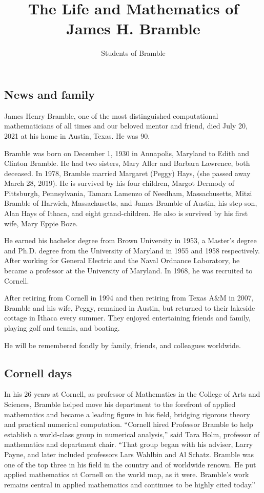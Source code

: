 \documentclass[CJK,11pt]{amsart}
\theoremstyle{definition}
\begin{document}
\begin{CJK*}{UTF8}{gbsn}
\title{
The Life and Mathematics of James H. Bramble
}
\author{Students of Bramble}
\maketitle

\section{News and family}
James Henry Bramble, one of the most distinguished computational mathematicians of all times and our beloved mentor and friend, died July 20, 2021 at his home in Austin, Texas. He was 90.

Bramble was born on December 1, 1930 in Annapolis, Maryland to Edith and Clinton Bramble. He had two sisters, Mary Aller and Barbara Lawrence, both deceased. 
In 1978, Bramble married Margaret (Peggy) Hays, (she passed away March 28, 2019). 
He is survived by his four children, Margot Dermody of Pittsburgh, Pennsylvania, Tamara Lamenzo of Needham, Massachusetts, Mitzi Bramble of Harwich, Massachusetts, and James Bramble of Austin, his step-son, Alan Hays of Ithaca, and eight grand-children. He also is survived by his first wife, Mary Eppie Boze. 

{\color{red} He earned his bachelor degree from Brown University in
  1953, a Master's degree and Ph.D. degree from the University of
  Maryland in 1955 and 1958 respectively.  After working for General
  Electric and the Naval Ordnance Laboratory, he became a professor at
  the University of Maryland.  In 1968, he was recruited to Cornell.}

After retiring from Cornell in 1994 and then retiring from Texas A\&M
in 2007, Bramble and his wife, Peggy, remained in Austin, but returned
to their lakeside cottage in Ithaca every summer.  They enjoyed
entertaining friends and family, playing golf and tennis, and boating.

He will be remembered fondly by family, friends, and colleagues worldwide.

\subsection{Cornell days}
In his 26 years at Cornell, as professor of Mathematics in the College of Arts and Sciences,  Bramble helped move his department to the forefront of applied mathematics and became a leading figure in his field, bridging rigorous theory and practical numerical computation.  “Cornell hired Professor Bramble to help establish a world-class group in numerical analysis,” said Tara Holm, professor of mathematics and department chair. “That group began with his adviser, Larry Payne, and later included professors Lars Wahlbin and Al Schatz. Bramble was one of the top three in his field in the country and of worldwide renown. He put applied mathematics at Cornell on the world map, as it were. Bramble's work remains central in applied mathematics and continues to be highly cited today.”


\end{CJK*}
\end{document}
